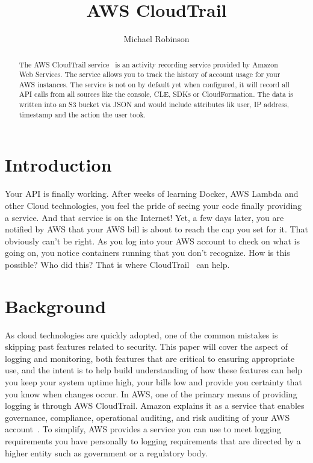 
\title{AWS CloudTrail}

\author{Michael Robinson}


\renewcommand{\shortauthors}{M. Robinson}


\begin{abstract}
The AWS CloudTrail service~\cite{hid-sp18-518-CloudTrail} is an activity recording service provided by Amazon Web Services. The service allows you to track the history of account usage for your AWS instances. The service is not on by default yet when configured, it will record all API calls from all sources like the console, CLE, SDKs or CloudFormation. The data is written into an S3 bucket via JSON and would include attributes lik user, IP address, timestamp and the action the user took.
\end{abstract}


\maketitle

\section{Introduction}

Your API is finally working. After weeks of learning Docker, AWS Lambda and other Cloud technologies, you feel the pride of seeing your code finally providing a service. And that service is on the Internet! Yet, a few days later, you are notified by AWS that your AWS bill is about to reach the cap you set for it. That obviously can’t be right. As you log into your AWS account to check on what is going on, you notice containers running that you don’t recognize. How is this possible? Who did this? That is where CloudTrail~\cite{hid-sp18-518-CloudTrail} can help.

\section{Background}

As cloud technologies are quickly adopted, one of the common mistakes is skipping past features related to security. This paper will cover the aspect of logging and monitoring, both features that are critical to ensuring appropriate use, and the intent is to help build understanding of how these features can help you keep your system uptime high, your bills low and provide you certainty that you know when changes occur.
In AWS, one of the primary means of providing logging is through AWS CloudTrail. Amazon explains it as a service that enables governance, compliance, operational auditing, and risk auditing of your AWS account~\cite{hid-sp18-518-CloudTrail-user-guide}. To simplify, AWS provides a service you can use to meet logging requirements you have personally to logging requirements that are directed by a higher entity such as government or a regulatory body.

